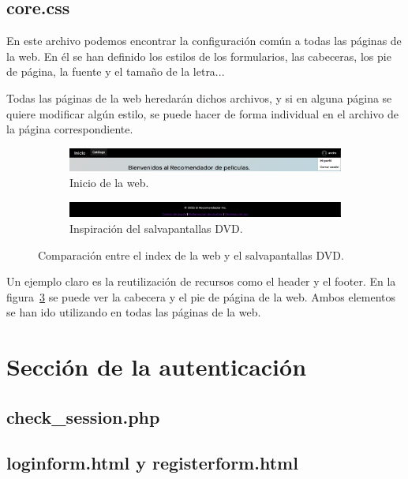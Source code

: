\documentclass[a4paper, 12pt]{report}
\begin{document}
    \section{core.css}
    En este archivo podemos encontrar la configuración común a todas las páginas de la web. En él se han definido los estilos de los formularios, las cabeceras, los pie de página, la fuente y el tamaño de la letra...

    Todas las páginas de la web heredarán dichos archivos, y si en alguna página se quiere modificar algún estilo, se puede hacer de forma individual en el archivo de la página correspondiente.

    \begin{figure}[h!]
        \centering
        \begin{subfigure}{0.45\textwidth}
            \includegraphics[width=\textwidth]{resources/img/header.png}
            \caption{Inicio de la web.}
            \label{fig:header}
        \end{subfigure}
        \hfill
        \begin{subfigure}{0.45\textwidth}
            \includegraphics[width=\textwidth]{resources/img/footer.png}
            \caption{Inspiración del salvapantallas DVD.}
            \label{fig:footer}
        \end{subfigure}
        \caption{Comparación entre el index de la web y el salvapantallas DVD.}
        \label{fig:elementoscompartidos}
    \end{figure}

    Un ejemplo claro es la reutilización de recursos como el header y el footer. En la figura~\ref{fig:elementoscompartidos} se puede ver la cabecera y el pie de página de la web. Ambos elementos se han ido utilizando en todas las páginas de la web.
    \chapter{Sección de la autenticación}
    \section{check\_session.php}
    \section{loginform.html y registerform.html}
\end{document}
